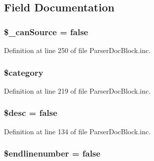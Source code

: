 \subsection{\-Field \-Documentation}
\hypertarget{classparser_doc_block_a8a4bb425608443c8ddddc1a58140e83a}{
\subsubsection[{\$\-\_\-can\-Source}]{\setlength{\rightskip}{0pt plus 5cm}\$\-\_\-can\-Source = false}}\label{classparser_doc_block_a8a4bb425608443c8ddddc1a58140e83a}


\-Definition at line 250 of file \-Parser\-Doc\-Block.\-inc.

\hypertarget{classparser_doc_block_a18b2a8d133fa7733bf34abcc6ca2ef5b}{
\subsubsection[{\$category}]{\setlength{\rightskip}{0pt plus 5cm}\$category}}\label{classparser_doc_block_a18b2a8d133fa7733bf34abcc6ca2ef5b}


\-Definition at line 219 of file \-Parser\-Doc\-Block.\-inc.

\hypertarget{classparser_doc_block_a31059b9e4d0c5af34df20da32232ea9a}{
\subsubsection[{\$desc}]{\setlength{\rightskip}{0pt plus 5cm}\$desc = false}}\label{classparser_doc_block_a31059b9e4d0c5af34df20da32232ea9a}


\-Definition at line 134 of file \-Parser\-Doc\-Block.\-inc.

\hypertarget{classparser_doc_block_a4d96f7721accddf9974537185fe43f0e}{
\subsubsection[{\$endlinenumber}]{\setlength{\rightskip}{0pt plus 5cm}\$endlinenumber = false}}\label{classparser_doc_block_a4d96f7721accddf9974537185fe43f0e}


